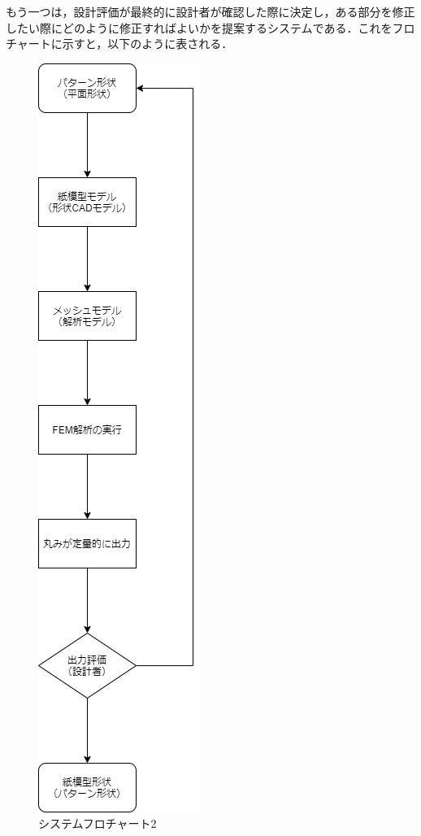 \documentclass[11pt]{jsarticle}
\begin{document}
			もう一つは，設計評価が最終的に設計者が確認した際に決定し，ある部分を修正したい際にどのように修正すればよいかを提案するシステムである．これをフロチャートに示すと，以下のように表される．
			\begin{figure}[h!]
				\centering
				\includegraphics[scale=0.5]{./figure/caseA.png}
				\caption{システムフロチャート2}
			\end{figure}
			
	\newpage
\vspace{10cm}

\vspace{14cm}
	\articleSPRfour
	\articleSPRfive
\end{document}
